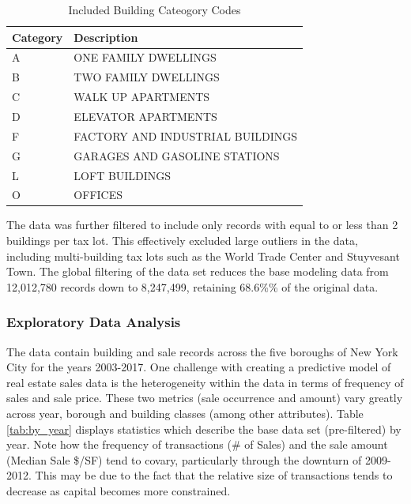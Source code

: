 \documentclass[12pt,]{article}
\begin{document}
\begin{table}

\caption{\label{tab:unnamed-chunk-6}\label{tab:categoryTable} Included Building Cateogory Codes}
\centering
\begin{tabular}[t]{ll}
\toprule
Category & Description\\
\midrule
A & ONE FAMILY DWELLINGS\\
B & TWO FAMILY DWELLINGS\\
C & WALK UP APARTMENTS\\
D & ELEVATOR APARTMENTS\\
F & FACTORY AND INDUSTRIAL BUILDINGS\\
\addlinespace
G & GARAGES AND GASOLINE STATIONS\\
L & LOFT BUILDINGS\\
O & OFFICES\\
\bottomrule
\end{tabular}
\end{table}

The data was further filtered to include only records with equal to or
less than 2 buildings per tax lot. This effectively excluded large
outliers in the data, including multi-building tax lots such as the
World Trade Center and Stuyvesant Town. The global filtering of the data
set reduces the base modeling data from 12,012,780 records down to
8,247,499, retaining 68.6\%\% of the original data.

\hypertarget{exploratory-data-analysis}{%
\subsubsection{Exploratory Data
Analysis}\label{exploratory-data-analysis}}

The data contain building and sale records across the five boroughs of
New York City for the years 2003-2017. One challenge with creating a
predictive model of real estate sales data is the heterogeneity within
the data in terms of frequency of sales and sale price. These two
metrics (sale occurrence and amount) vary greatly across year, borough
and building classes (among other attributes). Table \ref{tab:by_year}
displays statistics which describe the base data set (pre-filtered) by
year. Note how the frequency of transactions (\# of Sales) and the sale
amount (Median Sale \$/SF) tend to covary, particularly through the
downturn of 2009-2012. This may be due to the fact that the relative
size of transactions tends to decrease as capital becomes more
constrained.
\end{document}
